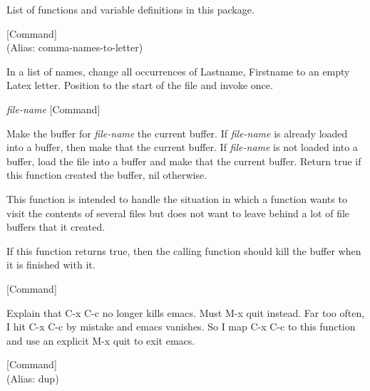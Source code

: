 List of functions and variable definitions in this package.



\vspace{1em}
\noindent
{}
\usebox{\funcname}
 \hfill [Command]\\%
 (Alias: comma-names-to-letter)

\begin{doc-string}
In a list of names, change all occurrences
of Lastname, Firstname to an empty Latex letter.
Position to the start of the file and invoke once.
\end{doc-string}

\vspace{1em}
\noindent
{}
\usebox{\funcname}\emph{file-name}
 \hfill [Command]

\begin{doc-string}
Make the buffer for \emph{file-name} the current buffer.  If \emph{file-name} is already
loaded into a buffer, then make that the current buffer.  If \emph{file-name} is not
loaded into a buffer, load the file into a buffer and make that the current
buffer.  Return true if this function created the buffer, nil otherwise.

This function is intended to handle the situation in which a function wants
to visit the contents of several files but does not want to leave behind a
lot of file buffers that it created.

If this function returns true, then the calling function should kill the
buffer when it is finished with it.
\end{doc-string}

\vspace{1em}
\noindent
{}
\usebox{\funcname}
 \hfill [Command]

\begin{doc-string}
Explain that C-x C-c no longer kills emacs.  Must M-x quit instead.
Far too often, I hit C-x C-c by mistake and emacs vanishes.  So I map
C-x C-c to this function and use an explicit M-x quit to exit emacs.
\end{doc-string}

\vspace{1em}
\noindent
{}
\usebox{\funcname}
 \hfill [Command]\\%
 (Alias: dup)

